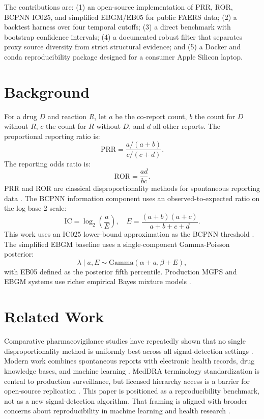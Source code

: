 \documentclass[12pt,onecolumn]{IEEEtran}
\begin{document}
The contributions are: (1) an open-source implementation of PRR, ROR, BCPNN
IC025, and simplified EBGM/EB05 for public FAERS data; (2) a backtest harness
over four temporal cutoffs; (3) a direct benchmark with bootstrap confidence
intervals; (4) a documented robust filter that separates proxy source diversity
from strict structural evidence; and (5) a Docker and conda reproducibility
package designed for a consumer Apple Silicon laptop.

\section{Background}
For a drug $D$ and reaction $R$, let $a$ be the co-report count, $b$ the count
for $D$ without $R$, $c$ the count for $R$ without $D$, and $d$ all other
reports. The proportional reporting ratio is:
\begin{equation}
\mathrm{PRR} = \frac{a/(a+b)}{c/(c+d)}.
\end{equation}
The reporting odds ratio is:
\begin{equation}
\mathrm{ROR} = \frac{a d}{b c}.
\end{equation}
PRR and ROR are classical disproportionality methods for spontaneous reporting
data \cite{evans2001prr,vanpuijenbroek2002ror}. The BCPNN information component
uses an observed-to-expected ratio on the log base-2 scale:
\begin{equation}
\mathrm{IC} = \log_2 \left(\frac{a}{E}\right), \quad
E = \frac{(a+b)(a+c)}{a+b+c+d}.
\end{equation}
This work uses an IC025 lower-bound approximation as the BCPNN threshold
\cite{bate1998bcpnn}. The simplified EBGM baseline uses a single-component
Gamma-Poisson posterior:
\begin{equation}
\lambda \mid a,E \sim \mathrm{Gamma}(\alpha + a, \beta + E),
\end{equation}
with EB05 defined as the posterior fifth percentile. Production MGPS and EBGM
systems use richer empirical Bayes mixture models \cite{dumouchel1999mgps,
szarfman2002screening,noren2013shrinkage}.

\section{Related Work}
Comparative pharmacovigilance studies have repeatedly shown that no single
disproportionality method is uniformly best across all signal-detection
settings \cite{vanpuijenbroek2002ror,hauben2009review,bate2009quantitative}.
Modern work combines spontaneous reports with electronic health records, drug
knowledge bases, and machine learning \cite{harpaz2012novel,wang2009active,
tatonetti2012data,banda2016curated,ietswaart2020machine}. MedDRA terminology
standardization is central to production surveillance, but licensed hierarchy
access is a barrier for open-source replication \cite{brown1999meddra,
mozzicato2009meddra}. This paper is positioned as a reproducibility benchmark,
not as a new signal-detection algorithm. That framing is aligned with broader
concerns about reproducibility in machine learning and health research
\cite{pineau2021reproducibility,beam2020reproducibility}.
\end{document}
